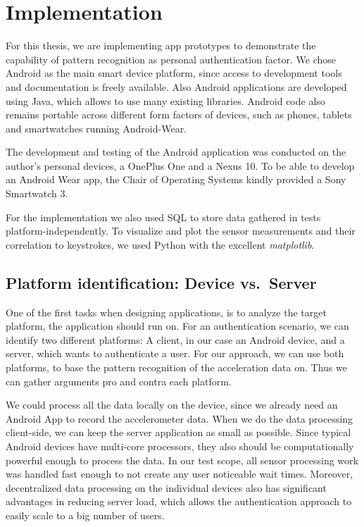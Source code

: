 \chapter{Implementation}\label{chapter:implementation}
For this thesis, we are implementing app prototypes to demonstrate the capability of pattern recognition as personal authentication factor. We chose Android as the main smart device platform, since access to development tools and documentation is freely available. Also Android applications are developed using Java, which allows to use many existing libraries. Android code also remains portable across different form factors of devices, such as phones, tablets and smartwatches running Android-Wear.

The development and testing of the Android application was conducted on the author's personal devices, a OnePlus One and a Nexus 10. To be able to develop an Android Wear app, the Chair of Operating Systems kindly provided a Sony Smartwatch 3.

For the implementation we also used SQL to store data gathered in tests platform-independently. To visualize and plot the sensor measurements and their correlation to keystrokes, we used Python with the excellent \emph{matplotlib}.

\section{Platform identification: Device vs.\ Server}
One of the first tasks when designing applications, is to analyze the target platform, the application should run on. For an authentication scenario, we can identify two different platforms: A client, in our case an Android device, and a server, which wants to authenticate a user. For our approach, we can use both platforms, to base the pattern recognition of the acceleration data on. Thus we can gather arguments pro and contra each platform.

We could process all the data locally on the device, since we already need an Android App to record the accelerometer data. When we do the data processing client-side, we can keep the server application as small as possible. Since typical Android devices have multi-core processors, they also should be computationally powerful enough to process the data. In our test scope, all sensor processing work was handled fast enough to not create any user noticeable wait times. Moreover, decentralized data processing on the individual devices also has significant advantages in reducing server load, which allows the authentication approach to easily scale to a big number of users.

